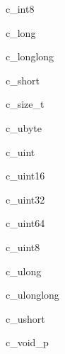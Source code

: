\begin{classdesc}{c_int8}{}
\end{classdesc}

\begin{classdesc}{c_long}{}
\end{classdesc}

\begin{classdesc}{c_longlong}{}
\end{classdesc}

\begin{classdesc}{c_short}{}
\end{classdesc}

\begin{classdesc}{c_size_t}{}
\end{classdesc}

\begin{classdesc}{c_ubyte}{}
\end{classdesc}

\begin{classdesc}{c_uint}{}
\end{classdesc}

\begin{classdesc}{c_uint16}{}
\end{classdesc}

\begin{classdesc}{c_uint32}{}
\end{classdesc}

\begin{classdesc}{c_uint64}{}
\end{classdesc}

\begin{classdesc}{c_uint8}{}
\end{classdesc}

\begin{classdesc}{c_ulong}{}
\end{classdesc}

\begin{classdesc}{c_ulonglong}{}
\end{classdesc}

\begin{classdesc}{c_ushort}{}
\end{classdesc}

\begin{classdesc}{c_void_p}{}
\end{classdesc}

